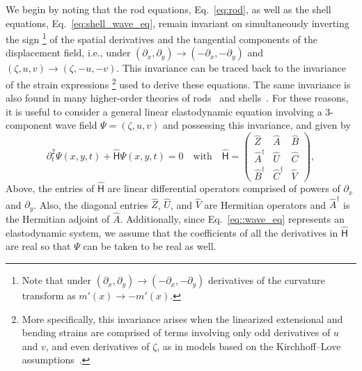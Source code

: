 We begin by noting that the rod equations, Eq.~\eqref{eq:rod}, as well as the shell equations, Eq.~\eqref{eq:shell_wave_eq}, remain invariant on simultaneously inverting the sign%
\footnote{Note that under $(\partial_{x}, \partial_{y}) \to (-\partial_{x}, -\partial_{y})$ derivatives of the curvature transform as $m'(x) \to -m'(x)$.}
of the spatial derivatives and the tangential components of the displacement field, i.e., under $(\partial_{x}, \partial_{y}) \to (-\partial_{x}, -\partial_{y})$ and $(\zeta, u, v) \to (\zeta, -u, -v)$.
This invariance can be traced back to the invariance of the strain expressions%
\footnote{More specifically, this invariance arises when the linearized extensional and bending strains are comprised of terms involving only odd derivatives of $u$ and $v$, and even derivatives of $\zeta$, as in models based on the Kirchhoff--Love assumptions~\cite{shankar2022}.
}
used to derive these equations.
The same invariance is also found in many higher-order theories of rods~\cite{chidamparam1993,walsh2000} and shells~\cite{doyle2021}.
For these reasons, it is useful to consider a general linear elastodynamic equation involving a 3-component wave field $\Psi = (\zeta, u, v)$ and possessing this invariance, and given by
%
\begin{equation}
  \partial_{t}^{2}\Psi(x, y, t) + \widehat{\mathsf{H}}\Psi(x, y, t) = 0
  \quad\text{with}\quad
  \widehat{\mathsf{H}} =
  \begin{pmatrix}
    \hat{Z} & \hat{A} & \hat{B}\\
    \hat{A}^{\dagger} & \hat{U} & \hat{C}\\
    \hat{B}^{\dagger} & \hat{C}^{\dagger} & \hat{V}
  \end{pmatrix},
  \label{eq::wave_eq}
\end{equation}
%
Above, the entries of $\widehat{\mathsf{H}}$ are linear differential operators comprised of powers of $\partial_{x}$ and $\partial_{y}$.
Also, the diagonal entries $\hat{Z}$, $\hat{U}$, and $\hat{V}$ are Hermitian operators and $\hat{A}^{\dagger}$ is the Hermitian adjoint of $\hat{A}$.
Additionally, since Eq.~\eqref{eq::wave_eq} represents an elastodynamic system, we assume that the coefficients of all the derivatives in $\widehat{\mathsf{H}}$ are real so that $\Psi$ can be taken to be real as well.

